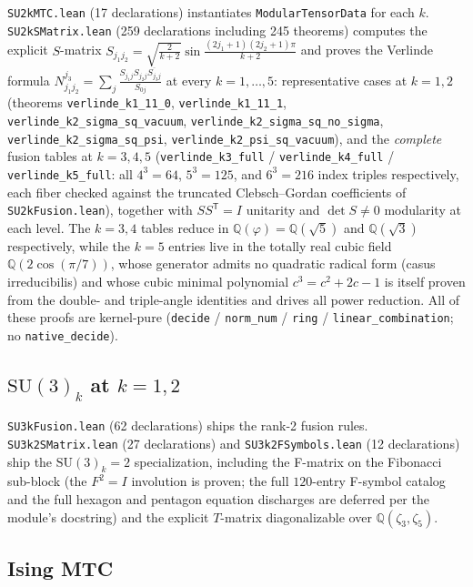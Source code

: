 \documentclass[11pt]{article}
\begin{document}
\texttt{SU2kMTC.lean} (17 declarations) instantiates
\texttt{ModularTensorData} for each $k$. \texttt{SU2kSMatrix.lean}
(259 declarations including 245 theorems) computes the explicit
$S$-matrix
$S_{j_1 j_2} = \sqrt{\frac{2}{k+2}}
\sin\!\frac{(2j_1+1)(2j_2+1)\pi}{k+2}$ and proves the Verlinde
formula
$N_{j_1 j_2}^{j_3} = \sum_{j} \frac{S_{j_1 j} S_{j_2 j}
\overline{S_{j_3 j}}}{S_{0 j}}$ at every $k = 1, \ldots, 5$:
representative cases at $k = 1, 2$
(theorems \texttt{verlinde\_k1\_11\_0}, \texttt{verlinde\_k1\_11\_1},
\texttt{verlinde\_k2\_sigma\_sq\_vacuum},
\texttt{verlinde\_k2\_sigma\_sq\_no\_sigma},
\texttt{verlinde\_k2\_sigma\_sq\_psi},
\texttt{verlinde\_k2\_psi\_sq\_vacuum}), and the \emph{complete}
fusion tables at $k = 3, 4, 5$
(\texttt{verlinde\_k3\_full} / \texttt{verlinde\_k4\_full} /
\texttt{verlinde\_k5\_full}: all $4^3 = 64$, $5^3 = 125$, and
$6^3 = 216$ index triples respectively, each fiber checked against
the truncated Clebsch--Gordan coefficients of
\texttt{SU2kFusion.lean}), together with
$S S^{\mathsf{T}} = I$ unitarity and $\det S \neq 0$ modularity at
each level. The $k = 3, 4$ tables reduce in
$\mathbb{Q}(\varphi) = \mathbb{Q}(\sqrt{5})$ and
$\mathbb{Q}(\sqrt{3})$ respectively, while the $k = 5$ entries live
in the totally real cubic field $\mathbb{Q}(2\cos(\pi/7))$, whose
generator admits no quadratic radical form (casus irreducibilis) and
whose cubic minimal polynomial $c^3 = c^2 + 2c - 1$ is itself proven
from the double- and triple-angle identities and drives all power
reduction. All of these proofs are kernel-pure
(\texttt{decide} / \texttt{norm\_num} / \texttt{ring} /
\texttt{linear\_combination}; no \texttt{native\_decide}).

\subsection{$\mathrm{SU}(3)_k$ at $k = 1, 2$}

\texttt{SU3kFusion.lean} (62 declarations) ships the rank-2 fusion
rules. \texttt{SU3k2SMatrix.lean} (27 declarations) and
\texttt{SU3k2FSymbols.lean} (12 declarations) ship the
$\mathrm{SU}(3)_k=2$ specialization, including the F-matrix on the
Fibonacci sub-block (the $F^2 = I$ involution is proven; the full
$120$-entry F-symbol catalog and the full hexagon and pentagon
equation discharges are deferred per the module's docstring) and
the explicit $T$-matrix diagonalizable over
$\mathbb{Q}(\zeta_3, \zeta_5)$.

\subsection{Ising MTC}
\end{document}
